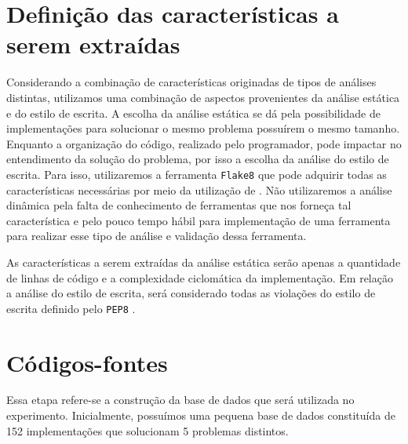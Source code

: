 	\section{Definição das características a serem extraídas}
		Considerando a combinação de características originadas de tipos de análises
		distintas, utilizamos uma combinação de aspectos provenientes da análise  %
		estática e do estilo de escrita. A escolha da análise estática se dá pela
		possibilidade de implementações para solucionar o mesmo problema possuírem
		o mesmo tamanho. Enquanto a organização do código, realizado pelo programador,
		pode impactar no entendimento da solução do problema, por isso a escolha da
		análise do estilo de escrita. Para isso, utilizaremos a ferramenta \texttt{Flake8}
		\cite{flake8} que pode adquirir todas as características necessárias por meio da
		utilização de . Não utilizaremos a análise dinâmica pela falta
		de conhecimento de ferramentas que nos forneça tal característica e pelo pouco
		tempo hábil para implementação de uma ferramenta para realizar esse tipo de
		análise e validação dessa ferramenta.
		
		As características a serem extraídas da análise estática serão apenas a quantidade
		de linhas de código e a complexidade ciclomática da implementação. Em relação
		a análise do estilo de escrita, será considerado todas as violações do estilo de
		escrita definido pelo \texttt{PEP8} \cite{van2001pep}. 

	\section{Códigos-fontes}	
		Essa etapa refere-se a construção da base de dados que será utilizada no experimento.
		Inicialmente, possuímos uma pequena base de dados constituída de 152 implementações
		que solucionam 5 problemas distintos.
		
